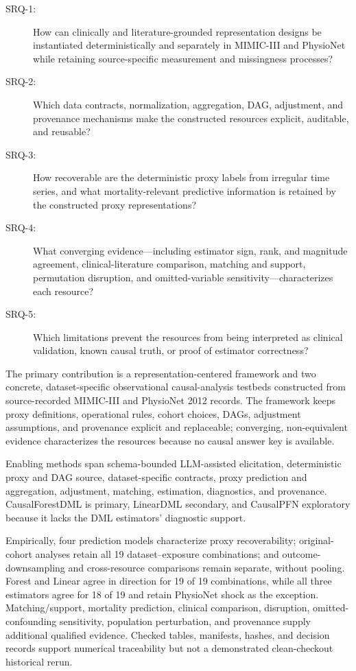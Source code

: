 \begin{description}
  \item[SRQ-1:] How can clinically and literature-grounded representation designs be instantiated deterministically and separately in MIMIC-III and PhysioNet while retaining source-specific measurement and missingness processes?
  \item[SRQ-2:] Which data contracts, normalization, aggregation, DAG, adjustment, and provenance mechanisms make the constructed resources explicit, auditable, and reusable?
  \item[SRQ-3:] How recoverable are the deterministic proxy labels from irregular time series, and what mortality-relevant predictive information is retained by the constructed proxy representations?
  \item[SRQ-4:] What converging evidence---including estimator sign, rank, and magnitude agreement, clinical-literature comparison, matching and support, permutation disruption, and omitted-variable sensitivity---characterizes each resource?
  \item[SRQ-5:] Which limitations prevent the resources from being interpreted as clinical validation, known causal truth, or proof of estimator correctness?
\end{description}

The primary contribution is a representation-centered framework and two concrete, dataset-specific observational causal-analysis testbeds constructed from source-recorded MIMIC-III and PhysioNet 2012 records.  The framework keeps proxy definitions, operational rules, cohort choices, DAGs, adjustment assumptions, and provenance explicit and replaceable; converging, non-equivalent evidence characterizes the resources because no causal answer key is available.

Enabling methods span schema-bounded LLM-assisted elicitation, deterministic proxy and DAG source, dataset-specific contracts, proxy prediction and aggregation, adjustment, matching, estimation, diagnostics, and provenance.  CausalForestDML is primary, LinearDML secondary, and CausalPFN exploratory because it lacks the DML estimators' diagnostic support.

Empirically, four prediction models characterize proxy recoverability; original-cohort analyses retain all 19 dataset--exposure combinations; and outcome-downsampling and cross-resource comparisons remain separate, without pooling.  Forest and Linear agree in direction for 19 of 19 combinations, while all three estimators agree for 18 of 19 and retain PhysioNet shock as the exception.  Matching/support, mortality prediction, clinical comparison, disruption, omitted-confounding sensitivity, population perturbation, and provenance supply additional qualified evidence.  Checked tables, manifests, hashes, and decision records support numerical traceability but not a demonstrated clean-checkout historical rerun.


